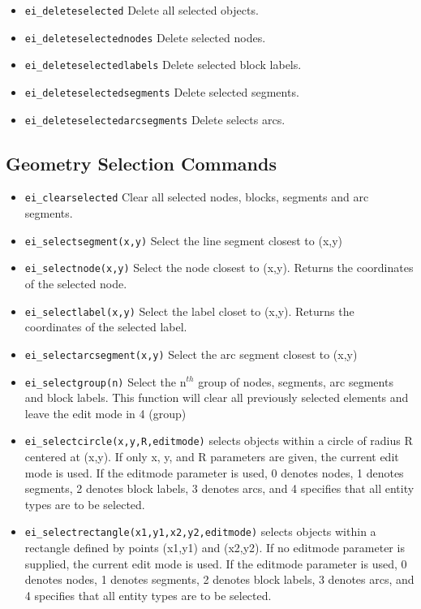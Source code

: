 \begin{itemize}
\item {\tt ei\_deleteselected} Delete all selected objects.

\item {\tt ei\_deleteselectednodes} Delete selected nodes.

\item {\tt ei\_deleteselectedlabels} Delete selected block labels.

\item {\tt ei\_deleteselectedsegments} Delete selected segments.

\item {\tt ei\_deleteselectedarcsegments} Delete selects arcs.
\end{itemize}


\subsection{Geometry Selection Commands}

\begin{itemize}
\item {\tt ei\_clearselected} Clear all selected nodes, blocks, segments and arc
segments.

\item {\tt ei\_selectsegment(x,y)} Select the line segment closest to (x,y)

\item {\tt ei\_selectnode(x,y)} Select the node closest to (x,y).
Returns the coordinates of the selected node.

\item {\tt ei\_selectlabel(x,y)} Select the label closet to (x,y).
Returns the coordinates of the selected label.

\item {\tt ei\_selectarcsegment(x,y)} Select the arc segment closest to (x,y)

\item {\tt ei\_selectgroup(n)} Select the n$^{th}$ group of nodes, segments, arc
segments and block labels. This function will clear all previously selected
elements and leave the edit mode in 4 (group)

\item{\tt ei\_selectcircle(x,y,R,editmode)} selects objects within a circle of radius
R centered at (x,y).  If only x, y, and R parameters are given, the current
edit mode is used.  If the editmode parameter is used, 0 denotes nodes, 1 denotes segments,
2 denotes block labels, 3 denotes arcs, and 4 specifies that all entity types are to be selected.

\item{\tt ei\_selectrectangle(x1,y1,x2,y2,editmode)} selects objects within a rectangle
defined by points (x1,y1) and (x2,y2). If no editmode parameter is supplied,
the current edit mode is used.  If the editmode parameter is used, 0 denotes nodes, 1 denotes segments,
2 denotes block labels, 3 denotes arcs, and 4 specifies that all entity types are to be selected.

\end{itemize}


